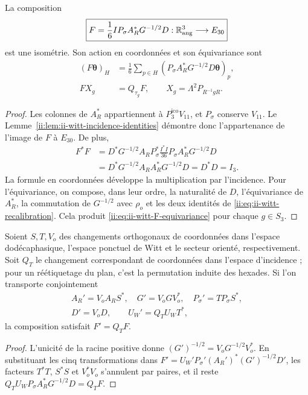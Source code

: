 \begin{theorem}
\label{ii:thm:ii-witt-angular-transport}
La composition
\begin{equation}
 \boxed{F=\frac16 I P_\sigma A_R^*G^{-1/2}D:
        \mathbb R^3_{\rm ang}\longrightarrow E_{30}}
 \label{ii:eq:ii-witt-F}
\end{equation}
est une isométrie. Son action en coordonnées et son équivariance sont
\begin{align}
 (F\boldsymbol\theta)_H
 &=\frac16\sum_{p\in H}
       (P_\sigma A_R^*G^{-1/2}D\boldsymbol\theta)_p,
       \label{ii:eq:ii-witt-F-coordinates}\\
 F X_g&=Q_{\tau_g}F,
 \qquad X_g=\Lambda^2P_{R^{-1}gR}.
       \label{ii:eq:ii-witt-F-equivariance}
\end{align}
\end{theorem}
\begin{proof}
Les colonnes de \(A_R^*\) appartiennent à \(P_3^{\mathrm{ico}}V_{11}\), et
\(P_\sigma\) conserve \(V_{11}\). Le
Lemme~\ref{ii:lem:ii-witt-incidence-identities} démontre donc
l’appartenance de l’image de \(F\) à \(E_{30}\). De plus,
\begin{align*}
 F^*F
 &=D^*G^{-1/2}A_RP_\sigma^*
       \frac{I^*I}{36}P_\sigma A_R^*G^{-1/2}D\\
 &=D^*G^{-1/2}A_RA_R^*G^{-1/2}D
  =D^*D=I_3.
\end{align*}
La formule en coordonnées développe la multiplication par l’incidence.
Pour l’équivariance, on compose, dans leur ordre, la naturalité de \(D\),
l’équivariance de \(A_R^*\), la commutation de \(G^{-1/2}\) avec
\(\rho_o\) et les deux identités de
\eqref{ii:eq:ii-witt-recalibration}. Cela produit
\eqref{ii:eq:ii-witt-F-equivariance} pour chaque \(g\in S_3\).
\end{proof}

\begin{proposition}
\label{ii:prop:ii-witt-gauge-covariance}
Soient \(S,T,V_o\) des changements orthogonaux de coordonnées dans l’espace
dodécaphasique, l’espace ponctuel de Witt et le secteur orienté,
respectivement. Soit \(Q_T\) le changement correspondant de coordonnées
dans l’espace d’incidence ; pour un réétiquetage du plan, c’est la
permutation induite des hexades. Si l’on transporte conjointement
\[
\begin{gathered}
 A_R'=V_oA_RS^*,\quad G'=V_oGV_o^*,\quad
 P_\sigma'=TP_\sigma S^*,\\
 D'=V_oD,\qquad U_W'=Q_TU_WT^*,
\end{gathered}
\]
la composition satisfait \(F'=Q_TF\).
\end{proposition}
\begin{proof}
L’unicité de la racine positive donne
\((G')^{-1/2}=V_oG^{-1/2}V_o^*\). En substituant les cinq
transformations dans
\(F'=U_W'P_\sigma'(A_R')^*(G')^{-1/2}D'\), les facteurs
\(T^*T\), \(S^*S\) et \(V_o^*V_o\) s’annulent par paires, et il reste
\(Q_TU_WP_\sigma A_R^*G^{-1/2}D=Q_TF\).
\end{proof}

